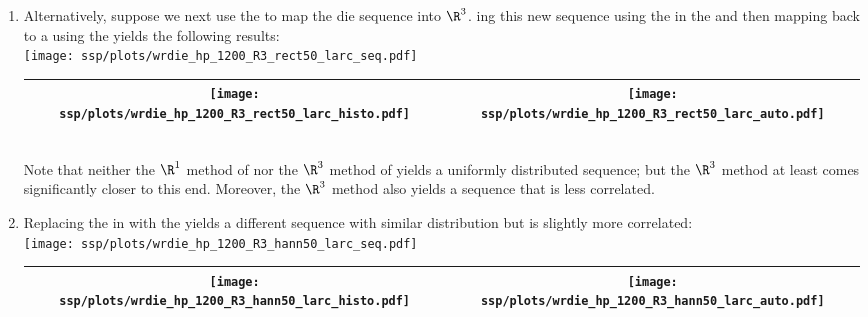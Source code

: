 \begin{example}
\begin{enumerate}
  \item \label{item:wrdie_hp_R3_rect50_larc}
        Alternatively, suppose we next use the  
        to map the die sequence into $\R^3$.
        ing this new sequence using the 
        in the   
        and then mapping back to a  %
        using the  yields the following results:
        \\\texttt{[image: ssp/plots/wrdie\_hp\_1200\_R3\_rect50\_larc\_seq.pdf]}
        \\\begin{tabular}{|>{\scs}c|>{\scs}c|}
             \hline
             \texttt{[image: ssp/plots/wrdie\_hp\_1200\_R3\_rect50\_larc\_histo.pdf]}
            &\texttt{[image: ssp/plots/wrdie\_hp\_1200\_R3\_rect50\_larc\_auto.pdf]}
           \\\hline
        \end{tabular}\\
        Note that neither the $\R^1$ method of 
        nor the $\R^3$ method of 
        yields a uniformly distributed sequence; 
        but the $\R^3$ method at least comes significantly closer to this end.
        Moreover, the $\R^3$ method also yields a sequence that is less correlated.

  \item \label{item:wrdie_hp_R3_hann50_larc}
        Replacing the  in 
        with the   yields a different sequence
        with similar distribution but is slightly more correlated:
        \\\texttt{[image: ssp/plots/wrdie\_hp\_1200\_R3\_hann50\_larc\_seq.pdf]}
        \\\begin{tabular}{|>{\scs}c|>{\scs}c|}
             \hline
             \texttt{[image: ssp/plots/wrdie\_hp\_1200\_R3\_hann50\_larc\_histo.pdf]}
            &\texttt{[image: ssp/plots/wrdie\_hp\_1200\_R3\_hann50\_larc\_auto.pdf]}
           \\\hline
        \end{tabular}


\end{enumerate}
\end{example}
